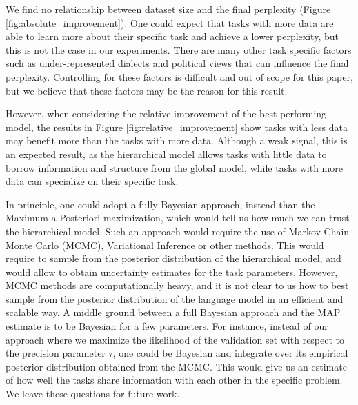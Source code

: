 \documentclass[fullpaper]{nldl}
\begin{document}
We find no relationship between dataset size and the final perplexity (Figure \ref{fig:absolute_improvement}). One could expect that tasks with more data are able to learn more about their specific task and achieve a lower perplexity, but this is not the case in our experiments. There are many other task specific factors such as under-represented dialects and political views that can influence the final perplexity. Controlling for these factors is difficult and out of scope for this paper, but we believe that these factors may be the reason for this result.

However, when considering the relative improvement of the best performing model, the results in Figure \ref{fig:relative_improvement} show tasks with less data may benefit more than the tasks with more data. Although a weak signal, this is an expected result, as the hierarchical model allows tasks with little data to borrow information and structure from the global model, while tasks with more data can specialize on their specific task.

In principle, one could adopt a fully Bayesian approach, instead than the Maximum a Posteriori maximization, which would tell us how much we can trust the hierarchical model. Such an approach  would require the use of Markov Chain Monte Carlo (MCMC), Variational Inference or other methods.
This would require to sample from the posterior distribution of the hierarchical model, and would allow to obtain uncertainty estimates for the task parameters.
However, MCMC methods are computationally heavy, and it is not clear to us how to best sample from the posterior distribution of the language model in an efficient and scalable way.
A middle ground between a full Bayesian approach and the MAP estimate is to be Bayesian for a few parameters. For instance, instead of our approach where we maximize the likelihood of the validation set with respect to the precision parameter $\tau$, one could be Bayesian and integrate over its empirical posterior distribution obtained from the MCMC. This would give us an estimate of how well the tasks share information with each other in the specific problem.
We leave these questions for future work.
\end{document}

